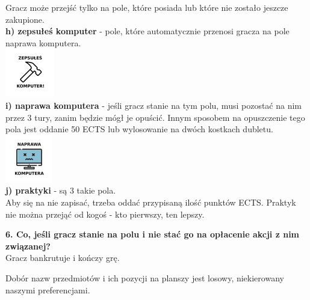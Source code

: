 \documentclass[a4paper]{article}
\begin{document}
\indent Gracz może przejść tylko na pole, które posiada lub które nie zostało jeszcze zakupione. \\
\noindent \textbf{h) zepsułeś komputer} - pole, które automatycznie przenosi gracza na pole naprawa komputera.\\
\indent\includegraphics[scale=0.8]{jail.png}\\
\noindent \textbf{i) naprawa komputera} - jeśli gracz stanie na tym polu, musi pozostać na nim przez 3 tury, zanim będzie mógł je opuścić. Innym sposobem na opuszczenie tego pola jest oddanie 50 ECTS lub wylosowanie na dwóch kostkach dubletu.\\
\indent\includegraphics[scale=0.8]{injail.png}\\
\noindent \textbf{j) praktyki} - są 3 takie pola.\\
\indent Aby się na nie zapisać, trzeba oddać przypisaną ilość punktów ECTS. Praktyk nie można przejąć od kogoś - kto pierwszy, ten lepszy.
\vspace{10pt}

\noindent \textbf{6. Co, jeśli gracz stanie na polu i nie stać go na opłacenie akcji z nim związanej?}\\
\noindent Gracz bankrutuje i kończy grę.
\vspace{10pt}

\noindent Dobór nazw przedmiotów i ich pozycji na planszy jest losowy, niekierowany naszymi preferencjami.
\end{document}
